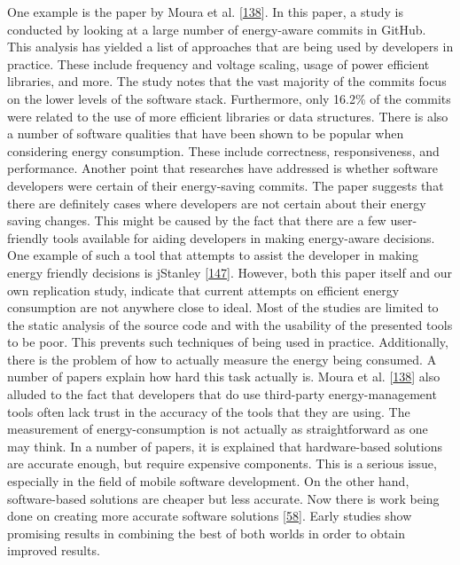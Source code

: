 \documentclass[]{book}
\begin{document}
One example is the paper by Moura et al.
{[}\protect\hyperlink{ref-MPEC2015}{138}{]}. In this paper, a study is
conducted by looking at a large number of energy-aware commits in
GitHub. This analysis has yielded a list of approaches that are being
used by developers in practice. These include frequency and voltage
scaling, usage of power efficient libraries, and more. The study notes
that the vast majority of the commits focus on the lower levels of the
software stack. Furthermore, only 16.2\% of the commits were related to
the use of more efficient libraries or data structures. There is also a
number of software qualities that have been shown to be popular when
considering energy consumption. These include correctness,
responsiveness, and performance. Another point that researches have
addressed is whether software developers were certain of their
energy-saving commits. The paper suggests that there are definitely
cases where developers are not certain about their energy saving
changes. This might be caused by the fact that there are a few
user-friendly tools available for aiding developers in making
energy-aware decisions. One example of such a tool that attempts to
assist the developer in making energy friendly decisions is jStanley
{[}\protect\hyperlink{ref-PSCS2018}{147}{]}. However, both this paper
itself and our own replication study, indicate that current attempts on
efficient energy consumption are not anywhere close to ideal. Most of
the studies are limited to the static analysis of the source code and
with the usability of the presented tools to be poor. This prevents such
techniques of being used in practice. Additionally, there is the problem
of how to actually measure the energy being consumed. A number of papers
explain how hard this task actually is. Moura et al.
{[}\protect\hyperlink{ref-MPEC2015}{138}{]} also alluded to the fact
that developers that do use third-party energy-management tools often
lack trust in the accuracy of the tools that they are using. The
measurement of energy-consumption is not actually as straightforward as
one may think. In a number of papers, it is explained that
hardware-based solutions are accurate enough, but require expensive
components. This is a serious issue, especially in the field of mobile
software development. On the other hand, software-based solutions are
cheaper but less accurate. Now there is work being done on creating more
accurate software solutions
{[}\protect\hyperlink{ref-NPPPZL2017}{58}{]}. Early studies show
promising results in combining the best of both worlds in order to
obtain improved results.
\end{document}
